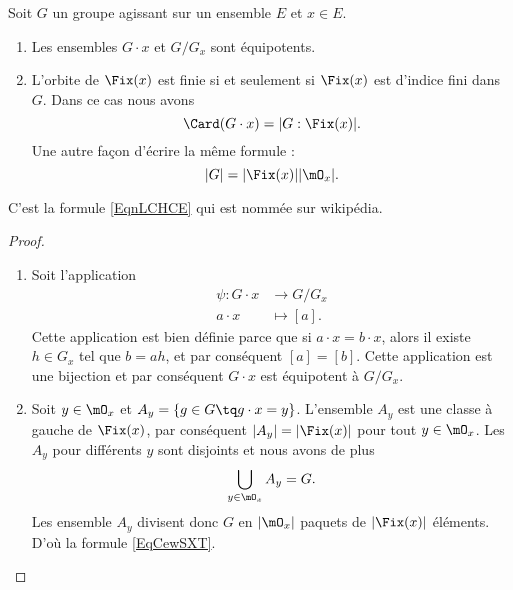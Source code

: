 \begin{proposition}     \label{Propszymlr}
    Soit \( G\) un groupe agissant sur un ensemble \( E\) et \( x\in E\).
    \begin{enumerate}
        \item
            Les ensembles \( G\cdot x\) et \( G/G_x\) sont équipotents.
        \item       \label{ITEMooCWUGooCOFHYk}
            L'orbite de \(\Fix(x)\) est finie si et seulement si \( \Fix(x)\) est d'indice fini dans \( G\). Dans ce cas nous avons
            \begin{equation}        \label{EqnLCHCE}
                \Card(G\cdot x)=| G:\Fix(x) |.
            \end{equation}
            Une autre façon d'écrire la même formule :
            \begin{equation}        \label{EqCewSXT}
                | G |=| \Fix(x) | |\mO_x |.
            \end{equation}
    \end{enumerate}
\end{proposition}
C'est la formule \eqref{EqnLCHCE} qui est nommée  sur wikipédia.

\begin{proof}
    \begin{enumerate}
        \item
    Soit l'application
    \begin{equation}
        \begin{aligned}
            \psi\colon G\cdot x&\to G/G_x \\
            a\cdot x&\mapsto [a].
        \end{aligned}
    \end{equation}
    Cette application est bien définie parce que si \( a\cdot x=b\cdot x\), alors il existe \( h\in G_x\) tel que \( b=ah\), et par conséquent \( [a]=[b]\). Cette application est une bijection et par conséquent \( G\cdot x\) est équipotent à \( G/G_x\).
    \item
        Soit \( y\in \mO_x\) et \( A_y=\{ g\in G\tq g\cdot x=y \}\). L'ensemble \( A_y\) est une classe à gauche de \( \Fix(x)\), par conséquent \( | A_y |=|\Fix(x)|\) pour tout \( y\in\mO_x\). Les \( A_y\) pour différents \( y\) sont disjoints et nous avons de plus
        \begin{equation}
            \bigcup_{y\in\mO_x}A_y=G.
        \end{equation}
        Les ensemble \( A_y\) divisent donc \( G\) en \( | \mO_x |\) paquets de \( | \Fix(x) |\) éléments. D'où la formule \eqref{EqCewSXT}.

    \end{enumerate}
\end{proof}

